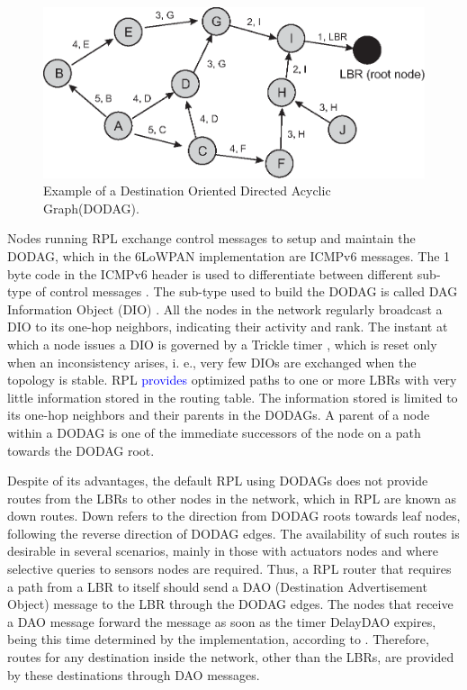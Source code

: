 \documentclass[authoryear,preprint,review,12pt]{elsarticle}
\newcommand{\rev}{\textcolor{blue}}
\begin{document}
\begin{figure}[h!tb]
\centering
\includegraphics[width=1\textwidth]{figures/RPL_DIO}
\caption{Example of a Destination Oriented Directed Acyclic Graph(DODAG).}
\label{RPL_DIO}
\end{figure}

Nodes running RPL exchange control messages to setup and maintain the DODAG, which in the 6LoWPAN implementation are ICMPv6 messages. The 1 byte code in the ICMPv6 header is used to differentiate between different sub-type of control messages \citep{RFC4443}. The sub-type used to build the DODAG is called DAG Information Object (DIO) \citep{RFC6550}. All the nodes in the network regularly broadcast a DIO to its one-hop neighbors, indicating their activity and rank. The instant at which a node issues a DIO is governed by a Trickle timer \citep{trickle}, which is reset only when an inconsistency arises, i. e., very few DIOs are exchanged when the topology is stable. RPL \rev{provides} optimized paths to one or more LBRs with very little information stored in the routing table. The information stored is limited to its one-hop neighbors and their parents in the DODAGs. A parent of a node within a DODAG is one of the immediate successors of the node on a path towards the DODAG root.

Despite of its advantages, the default RPL using DODAGs does not provide routes from the LBRs to other nodes in the network, which in RPL are known as down routes. Down refers to the direction from DODAG roots towards leaf nodes, following the reverse direction of DODAG edges. The availability of such routes is desirable in several scenarios, mainly in those with actuators nodes and where selective queries to sensors nodes are required. Thus, a RPL router that requires a path from a LBR to itself should send a DAO (Destination Advertisement Object) message to the LBR through the DODAG edges. The nodes that receive a DAO message forward the message as soon as the timer DelayDAO expires, being this time determined by the implementation, according to \citep{RFC6550}. Therefore, routes for any destination inside the network, other than the LBRs, are provided by these destinations through DAO messages.
\end{document}
